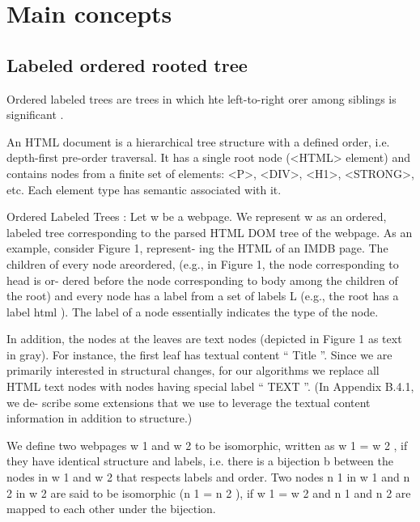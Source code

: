 \chapter{Main concepts}


\section{Labeled ordered rooted tree}

Ordered labeled trees are trees in which hte left-to-right orer among siblings is significant \cite{shasha1990a}.

An HTML document is a hierarchical tree structure with a defined order, i.e. depth-first pre-order traversal. It has a single root node (<HTML> element) and contains nodes from a finite set of elements: <P>, <DIV>, <H1>, <STRONG>, etc. Each element type has semantic associated with it.

Ordered Labeled Trees : Let w be a webpage. We represent w as an ordered, labeled tree corresponding to the parsed HTML DOM tree of the webpage. As an example, consider Figure 1, represent- ing the HTML of an IMDB page. The children of every node areordered, (e.g., in Figure 1, the node corresponding to head is or- dered before the node corresponding to body among the children of the root) and every node has a label from a set of labels L (e.g., the root has a label html ). The label of a node essentially indicates the type of the node.

In addition, the nodes at the leaves are text nodes (depicted in Figure 1 as text in gray). For instance, the first leaf has textual content “ Title ”. Since we are primarily interested in structural changes, for our algorithms we replace all HTML text nodes with nodes having special label “ TEXT ”. (In Appendix B.4.1, we de- scribe some extensions that we use to leverage the textual content information in addition to structure.)

We define two webpages w 1 and w 2 to be isomorphic, written as w 1 = w 2 , if they have identical structure and labels, i.e. there is a bijection b between the nodes in w 1 and w 2 that respects labels and order. Two nodes n 1 in w 1 and n 2 in w 2 are said to be isomorphic (n 1 = n 2 ), if w 1 = w 2 and n 1 and n 2 are mapped to each other under the bijection.

